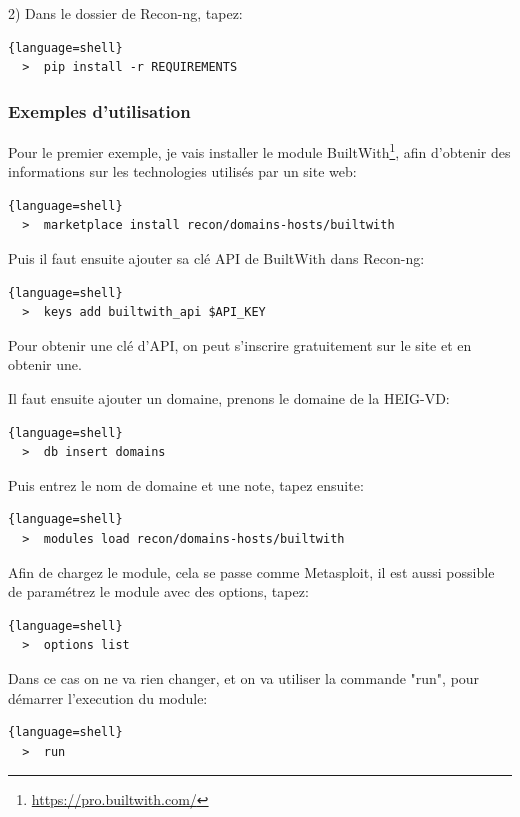 2) Dans le dossier de Recon-ng, tapez:

\begin{lstlisting}{language=shell}
  >  pip install -r REQUIREMENTS
\end{lstlisting}

\subsubsection{Exemples d'utilisation}
Pour le premier exemple, je vais installer le module BuiltWith\footnote{\url{https://pro.builtwith.com/}}, afin d'obtenir des informations
sur les technologies utilisés par un site web:

\begin{lstlisting}{language=shell}
  >  marketplace install recon/domains-hosts/builtwith
\end{lstlisting}

Puis il faut ensuite ajouter sa clé API de BuiltWith dans Recon-ng:

\begin{lstlisting}{language=shell}
  >  keys add builtwith_api $API_KEY
\end{lstlisting}

Pour obtenir une clé d'API, on peut s'inscrire gratuitement sur le site et en obtenir une.

Il faut ensuite ajouter un domaine, prenons le domaine de la HEIG-VD:

\begin{lstlisting}{language=shell}
  >  db insert domains
\end{lstlisting}

Puis entrez le nom de domaine et une note, tapez ensuite:

\begin{lstlisting}{language=shell}
  >  modules load recon/domains-hosts/builtwith
\end{lstlisting}

Afin de chargez le module, cela se passe comme Metasploit, il est aussi possible de paramétrez le
module avec des options, tapez:

\begin{lstlisting}{language=shell}
  >  options list
\end{lstlisting}

Dans ce cas on ne va rien changer, et on va utiliser la commande "run", pour démarrer l'execution du module:

\begin{lstlisting}{language=shell}
  >  run
\end{lstlisting}


